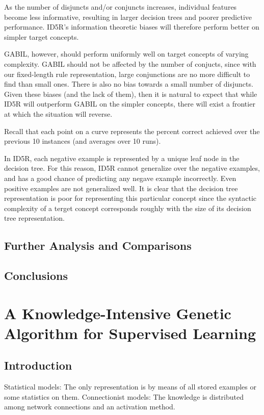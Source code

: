 \documentclass[12pt]{book}
\begin{document}
As the number of disjuncts and/or conjuncts increases, individual features become less informative, resulting in larger decision trees and poorer predictive performance. ID5R's information theoretic biases will therefore perform better on simpler target concepts.

GABIL, however, should perform uniformly well on target concepts of varying complexity. GABIL should not be affected by the number of conjucts, since with our fixed-length rule representation, large conjunctions are no more difficult to find than small ones. There is also no bias towards a small number of disjuncts. Given these biases (and the lack of them), then it is natural to expect that while ID5R will outperform GABIL on the simpler concepts, there will exist a frontier at which the situation will reverse.

Recall that each point on a curve represents the percent correct achieved over the previous 10 instances (and averages over 10 runs).

In ID5R, each negative example is represented by a unique leaf node in the decision tree. For this reason, ID5R cannot generalize over the negative examples, and has a good chance of predicting any negave example incorrectly. Even positive examples are not generalized well. It is clear that the decision tree representation is poor for representing this particular concept since the syntactic complexity of a terget concept corresponds roughly with the size of its decision tree representation.

\section{Further Analysis and Comparisons}

\section{Conclusions}
\clearpage

\chapter{A Knowledge-Intensive Genetic Algorithm for Supervised Learning}

\section{Introduction}
Statistical models: The only representation is by means of all stored examples or some statistics on them. Connectionist models: The knowledge is distributed among network connections and an activation method.
\end{document}
